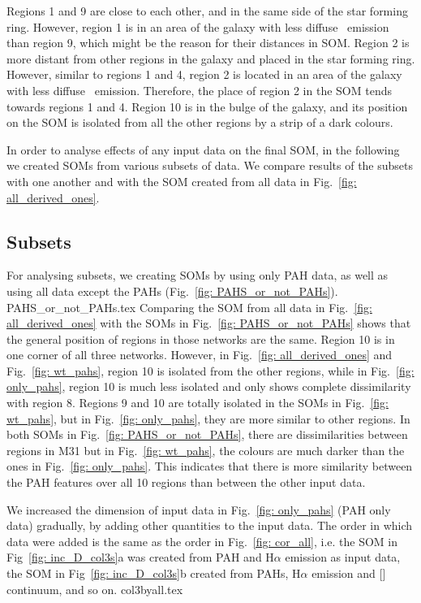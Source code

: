     Regions 1 and 9 are close to each other, and in the same side of the star forming ring. 
    However, region 1 is in an area of the galaxy with less diffuse \halpha~emission than region 9, which might be the reason for their distances in SOM.
    Region 2 is more distant from other regions in the galaxy and placed in the star forming ring.
    However, similar to regions 1 and 4, region 2 is located in an area of the galaxy with less diffuse \halpha~emission.
    Therefore, the place of region 2 in the SOM tends towards regions 1 and 4. 
    Region 10 is in the bulge of the galaxy, and its position on the SOM is isolated from all the other regions by a strip of a dark colours. 
    
    In order to analyse effects of any input data on the final SOM, in the following we created SOMs from various subsets of data.
    We compare results of the subsets with one another and with the SOM created from all data in Fig.~\ref{fig: all_derived_ones}.

    \subsection{Subsets}
    \label{sec: subsets}
            For analysing subsets, we creating SOMs by using only PAH data, as well as using all data except the PAHs (Fig.~\ref{fig: PAHS_or_not_PAHs}).
             {PAHS_or_not_PAHs.tex}
            Comparing the SOM from all data in Fig.~\ref{fig: all_derived_ones} with the SOMs in Fig.~\ref{fig: PAHS_or_not_PAHs} shows that the general position of regions in those networks are the same. 
            Region 10 is in one corner of all three networks.
            However, in Fig.~\ref{fig: all_derived_ones} and Fig.~\ref{fig: wt_pahs}, region 10 is isolated from the other regions, while in Fig.~\ref{fig: only_pahs}, region 10 is much less isolated and only shows complete dissimilarity with region 8.
            Regions 9 and 10 are totally isolated in the SOMs in Fig.~\ref{fig: wt_pahs}, but in Fig.~\ref{fig: only_pahs}, they are more similar to other regions.
            In both SOMs in Fig.~\ref{fig: PAHS_or_not_PAHs}, there are dissimilarities between regions in M31 but in Fig.~\ref{fig: wt_pahs}, the colours are much darker than the ones in Fig.~\ref{fig: only_pahs}.
            This indicates that there is more similarity between the PAH features over all 10 regions than between the other input data.
            
            We increased the dimension of input data in Fig.~\ref{fig: only_pahs} (PAH only data) gradually, by adding other quantities to the input data. 
            The order in which data were added is the same as the order in Fig.~\ref{fig: cor_all}, i.e. the SOM in Fig~\ref{fig: inc_D_col3s}a was created from PAH and H$\alpha$ emission as input data, the SOM in Fig~\ref{fig: inc_D_col3s}b created from PAHs, H$\alpha$ emission and [\sii] continuum, and so on. 
            {col3byall.tex}
            
